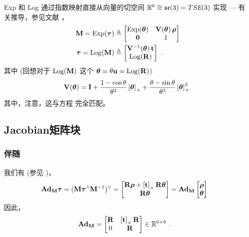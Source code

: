 Exp 和 Log 通过指数映射直接从向量的切空间 $\bbR^6\cong\se(3)=\mtan{\SE(3)}$ 实现 ---  有关推导，参见文献 \cite{EADE-Lie}，
%
\begin{align}
  \bfM = \Exp(\bftau) 
    &\te \begin{bmatrix}\Exp(\bth) & \bfV(\bth)\,\bfrho \\ \bf0 & 1  \end{bmatrix} \label{equ:SE3_Exp} \\
  \bftau = \Log(\bfM) 
    &\te \begin{bmatrix} \bfV\inv(\bth)\, \bft \\ \Log(\bfR) \end{bmatrix}~.
\end{align}
%
其中 (回想对于 $\Log(\bfM)$ 这个 $\bth=\theta\bfu=\Log(\bfR)$)
%
\begin{align}
\bfV(\bth) = \bfI 
  + \frac{1-\cos\theta}{\theta^2}\hatx{\bftheta}
  + \frac{\theta-\sin\theta}{\theta^3}\hatx{\bftheta}^2
~
\end{align}
%
其中，注意，这与方程  完全匹配。

\subsection{Jacobian矩阵块}
\label{sec:derivatives_SE3}

\subsubsection{伴随}

我们有 (参见 )，
%
\begin{align}
\Ad[\SE(3)]{\bfM}\bftau 
  &= (\bfM\bftau^\wedge\bfM\inv)^\vee \notag 
  = \begin{bmatrix}
  \bfR\bfrho+\hatx{\bft}\bfR\bth \\
  \bfR\bth
  \end{bmatrix} \notag 
  = \Ad[\SE(3)]{\bfM}\begin{bmatrix}
  \bfrho \\ \bth
  \end{bmatrix} \notag 
\end{align}
%
因此，
%
\begin{align}
  \Ad[\SE(3)]{\bfM} &= \begin{bmatrix}
  \bfR & \hatx{\bft}\bfR \\ 0 & \bfR
  \end{bmatrix} \in \bbR^{6\times6}
  ~.
\end{align}

